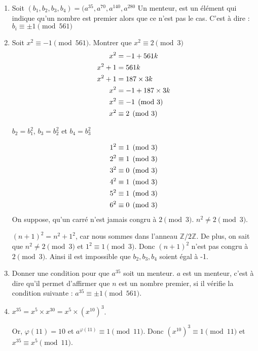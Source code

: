 \documentclass[a4paper,10pt]{article}
\newcommand{\Z}{\mathbb{Z}}
\begin{document}
	\begin{enumerate}
	\item
	Soit $(b_1,b_2,b_3,b_4)=(a^{35},a^{70},a^{140},a^{280}$
	Un menteur, est un élément qui indique qu'un nombre est premier alors que ce n'est pas le cas. C'est à dire : $b_i\equiv \pm 1\pmod{561}$
	\item
		Soit $x^2\equiv -1\pmod{561}$. Montrer que $x^2\equiv 2\pmod {3}$
		\begin{align}
			x^2 &= -1 + 561k \notag \\
			x^2 +1 &= 561k \notag \\
			x^2+1 &= 187 \times 3k \notag \\
			x^2 &= -1+187 \times 3k \notag \\
			x^2 &\equiv -1\pmod{3} \notag \\
			x^2 &\equiv 2\pmod{3} \notag
		\end{align}
		
		$b_2=b_1^2$, $b_3=b_2^2$ et $b_4=b_3^2$
		
		\begin{align}
			1^2 &\equiv 1 \pmod{3} \notag \\
			2^2 &\equiv 1 \pmod{3} \notag \\
			3^2 &\equiv 0 \pmod{3} \notag \\
			4^2 &\equiv 1 \pmod{3} \notag \\
			5^2 &\equiv 1 \pmod{3} \notag \\
			6^2 &\equiv 0 \pmod{3} \notag
		\end{align}				
		On suppose, qu'un carré n'est jamais congru à $2\pmod{3}$. $n^2 \neq 2\pmod{3}$.
		
		$(n+1)^2=n^2+1^2$, car nous sommes dans l'anneau $\Z/2\Z$.
		De plus, on sait que $n^2 \neq 2\pmod{3}$ et $1^2 \equiv 1 \pmod{3}$.
		Donc $(n+1)^2$ n'est pas congru à  $2\pmod{3}$. Ainsi il est impossible que $b_2,b_3,b_4$ soient égal à -1.
		
		
	
	\item
	Donner une condition pour que $a^{35}$ soit un menteur.
	$a$ est un menteur, c'est à dire qu'il permet d'affirmer que $n$ est un nombre premier, si il vérifie la condition suivante :
	$a^{35}\equiv \pm1 \pmod{561}$.
	\item
	$x^{35}=x^5 \times x^{30}=x^5 \times (x^{10})^3$.
	
	Or, $\varphi(11)=10$ et $a^{\varphi(11)}\equiv 1 \pmod{11}$.
	Donc $(x^{10})^3\equiv 1\pmod{11}$ et $x^{35}\equiv x^5 \pmod{11}$.
	

\end{enumerate}
\end{document}
